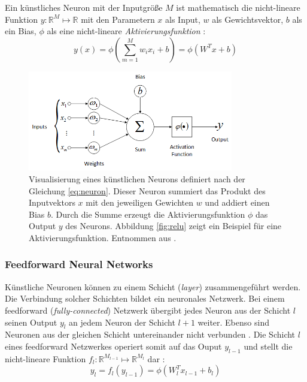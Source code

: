 Ein künstliches Neuron mit der Inputgröße $M$ ist mathematisch die nicht-lineare Funktion $y : \mathbb{R}^M \mapsto \mathbb{R}$ mit den Parametern $x$ als Input, $w$ als Gewichtsvektor, $b$ als ein Bias, $\phi$ als eine nicht-lineare \textit{Aktivierungsfunktion} \cite{CS231nConvolutionalNeural}:
\begin{equation}
	\label{eq:neuron}
	y(x)=\phi\left(\sum_{m=1}^{M} w_{i} x_{i} + b\right) = \phi(W^Tx+b)
\end{equation}

\vspace*{0.5cm}

\begin{figure}[H]
	\centering
	\includegraphics[width=0.8\textwidth]{images/neuron.png}
	\caption{Visualisierung eines künstlichen Neurons definiert nach der Gleichung \ref{eq:neuron}. Dieser Neuron summiert das Produkt des Inputvektors $x$  mit den jeweiligen Gewichten $w$ und addiert einen Bias $b$. Durch die Summe erzeugt die Aktivierungsfunktion $\phi$ das Output $y$ des Neurons. Abbildung \ref{fig:relu} zeigt ein Beispiel für eine Aktivierungsfunktion. Entnommen aus \cite{deoliveiraSystemBasedArtificial2017}. }
	\label{fig:neuron}
\end{figure}

\subsubsection{Feedforward Neural Networks}
\label{sec:feedforwardNN}
Künstliche Neuronen können zu einem Schicht (\textit{layer}) zusammengeführt werden. Die Verbindung solcher Schichten bildet ein neuronales Netzwerk.
Bei einem feedforward (\textit{fully-connected}) Netzwerk übergibt jedes Neuron aus der Schicht $l$ seinen Output $y_{l}$ an jedem Neuron der Schicht $l+1$ weiter. Ebenso sind Neuronen aus der gleichen Schicht untereinander nicht verbunden \cite{Goodfellow-et-al-2016}.
Die Schicht $l$ eines feedforward Netzwerkes operiert somit auf das Ouput $y_{l-1}$ und stellt die nicht-lineare Funktion $f_l :  \mathbb{R}^{M_{l-1}} \mapsto \mathbb{R}^{M_l}$ dar \cite{bauckhageInformedMachineLearning}:
\begin{equation}
\label{eq:layer}
y_l = f_l(y_{l-1}) = \phi(W^T_lx_{l-1}+b_{l})
\end{equation}


